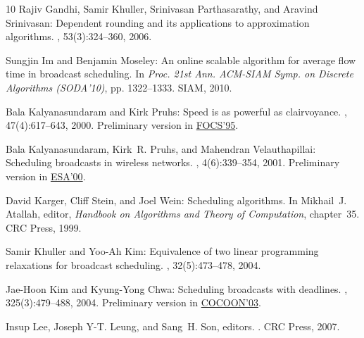 \begin{thebibliography}{10}
{\sc Rajiv Gandhi, Samir Khuller, Srinivasan Parthasarathy, and Aravind
  Srinivasan}: Dependent rounding and its applications to approximation
  algorithms.
, 53(3):324--360, 2006.
\newblock [\epfmtdoi{10.1145/1147954.1147956}]

{\sc Sungjin Im and Benjamin Moseley}: An online scalable algorithm for average
  flow time in broadcast scheduling.
\newblock In {\em Proc. 21st Ann. ACM-SIAM Symp. on Discrete Algorithms
  (SODA'10)}, pp. 1322--1333. SIAM, 2010.

{\sc Bala Kalyanasundaram and Kirk Pruhs}: Speed is as powerful as
  clairvoyance.
, 47(4):617--643, 2000.
\newblock Preliminary version in
  \href{http://dx.doi.org/10.1109/SFCS.1995.492478}{FOCS'95}.
\newblock [\epfmtdoi{10.1145/347476.347479}]

{\sc Bala Kalyanasundaram, Kirk~R. Pruhs, and Mahendran Velauthapillai}:
  Scheduling broadcasts in wireless networks.
, 4(6):339--354, 2001.
\newblock Preliminary version in
  \href{http://dx.doi.org/10.1007/3-540-45253-2\_27}{ESA'00}.

{\sc David Karger, Cliff Stein, and Joel Wein}: Scheduling algorithms.
\newblock In {\sc Mikhail~J. Atallah}, editor, {\em Handbook on Algorithms and
  Theory of Computation}, chapter~35. CRC Press, 1999.
\newblock [\epfmtdoi{10.1201/9781420049503-c36}]

{\sc Samir Khuller and Yoo-Ah Kim}: Equivalence of two linear programming
  relaxations for broadcast scheduling.
, 32(5):473--478, 2004.

{\sc Jae-Hoon Kim and Kyung-Yong Chwa}: Scheduling broadcasts with deadlines.
, 325(3):479--488, 2004.
\newblock Preliminary version in
  \href{http://dx.doi.org/10.1007/3-540-45071-8_42}{COCOON'03}.

{\sc Insup Lee, Joseph Y-T. Leung, and Sang~H. Son}, editors.
.
\newblock CRC Press, 2007.
\newblock [\epfmtdoi{10.1201/9781420011746}]


\end{thebibliography}
